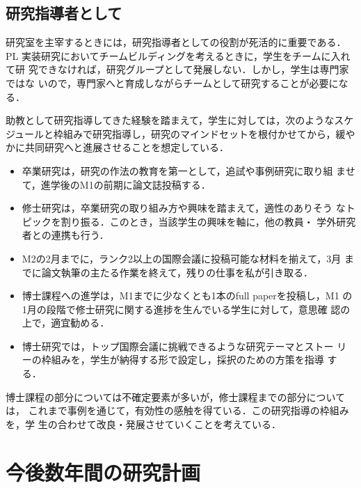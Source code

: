 \documentclass[dvipdfmx]{jsarticle}
\begin{document}
\subsection*{研究指導者として}
研究室を主宰するときには，研究指導者としての役割が死活的に重要である．PL
実装研究においてチームビルディングを考えるときに，学生をチームに入れて研
究できなければ，研究グループとして発展しない．しかし，学生は専門家ではな
いので，専門家へと育成しながらチームとして研究することが必要になる．

助教として研究指導してきた経験を踏まえて，学生に対しては，次のようなスケ
ジュールと枠組みで研究指導し，研究のマインドセットを根付かせてから，緩や
かに共同研究へと進展させることを想定している．
\begin{itemize}
 \item 卒業研究は，研究の作法の教育を第一として，追試や事例研究に取り組
       ませて，進学後のM1の前期に論文誌投稿する．

 \item 修士研究は，卒業研究の取り組み方や興味を踏まえて，適性のありそう
       なトピックを割り振る．このとき，当該学生の興味を軸に，他の教員・
       学外研究者との連携も行う．

 \item M2の2月までに，ランク2以上の国際会議に投稿可能な材料を揃えて，3月
       までに論文執筆の主たる作業を終えて，残りの仕事を私が引き取る．

 \item 博士課程への進学は，M1までに少なくとも1本のfull paperを投稿し，M1
       の1月の段階で修士研究に関する進捗を生んでいる学生に対して，意思確
       認の上で，適宜勧める．

 \item 博士研究では，トップ国際会議に挑戦できるような研究テーマとストー
       リーの枠組みを，学生が納得する形で設定し，採択のための方策を指導
       する．
\end{itemize}
博士課程の部分については不確定要素が多いが，修士課程までの部分については，
これまで事例を通じて，有効性の感触を得ている．この研究指導の枠組みを，学
生の合わせて改良・発展させていくことを考えている．

\section*{今後数年間の研究計画}
\end{document}
